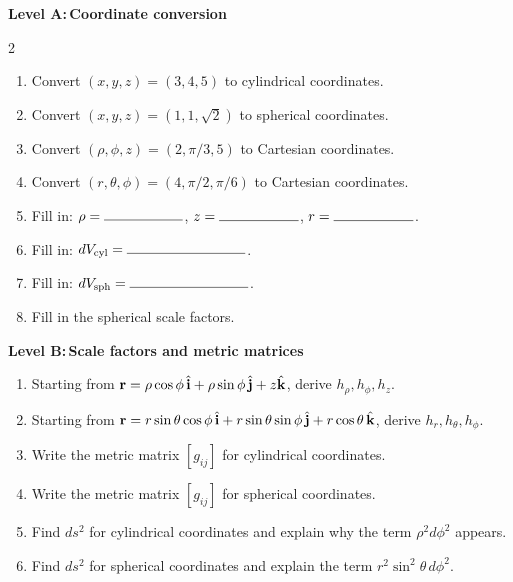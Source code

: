 \documentclass{otscience}
\begin{document}
\begin{practicebox}
    \textbf{Level A:\,Coordinate conversion}
    \begin{multicols}{2}
        \begin{enumerate}
            \item Convert \((x,y,z)=(3,4,5)\) to cylindrical coordinates.
            \item Convert \((x,y,z)=(1,1,\sqrt2)\) to spherical coordinates.
            \item Convert \((\rho,\phi,z)=(2,\pi/3,5)\) to Cartesian coordinates.
            \item Convert \((r,\theta,\phi)=(4,\pi/2,\pi/6)\) to Cartesian coordinates.
            \item Fill in: \(\rho=\blank[2cm]\), \(z=\blank[2cm]\), \(r=\blank[2cm]\).
            \item Fill in: \(dV_{\text{cyl}}=\blank[3cm]\).
            \item Fill in: \(dV_{\text{sph}}=\blank[3cm]\).
            \item Fill in the spherical scale factors.
        \end{enumerate}
    \end{multicols}

    \textbf{Level B:\,Scale factors and metric matrices}
    \begin{enumerate}
        \item Starting from \(\mathbf{r}=\rho\cos\phi\,\hat{\mathbf{i}}+\rho\sin\phi\,\hat{\mathbf{j}}+z\hat{\mathbf{k}}\), derive \(h_\rho,h_\phi,h_z\).
        \item Starting from \(\mathbf{r}=r\sin\theta\cos\phi\,\hat{\mathbf{i}}+r\sin\theta\sin\phi\,\hat{\mathbf{j}}+r\cos\theta\,\hat{\mathbf{k}}\), derive \(h_r,h_\theta,h_\phi\).
        \item Write the metric matrix \([g_{ij}]\) for cylindrical coordinates.
        \item Write the metric matrix \([g_{ij}]\) for spherical coordinates.
        \item Find \(ds^2\) for cylindrical coordinates and explain why the term \(\rho^2d\phi^2\) appears.
        \item Find \(ds^2\) for spherical coordinates and explain the term \(r^2\sin^2\theta\,d\phi^2\).
    \end{enumerate}


\end{practicebox}
\end{document}
